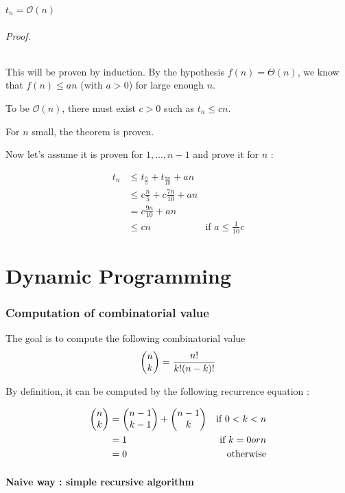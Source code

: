 \begin{theorem}
$t_n = \mathcal{O} (n)$
\end{theorem}

\paragraph*{Proof.}This will be proven by induction. By the hypothesis $f(n) = \Theta (n)$, we know that $f(n) \leq an$ (with $a>0$) for large enough $n$.

To be $\mathcal{O}(n)$, there must exist $c>0$ such as $t_n \leq cn$.

For $n$ small, the theorem is proven.

Now let's assume it is proven for $1,...,n-1$ and prove it for $n$ :

\begin{align*}
t_n &\leq t_{\frac{n}{5}} + t_{\frac{7n}{10}} + an\\
&\leq c \frac{n}{5} + c \frac{7n}{10} + an \\
&= c \frac{9n}{10} + an\\
&\leq cn &\text{if } a\leq \frac{1}{10}c
\end{align*}
\QED

\part{Dynamic Programming}

    \section{Computation of combinatorial value}



The goal is to compute the following combinatorial value  $$\left( \begin{matrix} n\\ k\end{matrix} \right) = \frac{n!}{k!(n-k)!}$$

By definition, it can be computed by the following recurrence equation :

\begin{align*}
\left( \begin{matrix} n\\ k\end{matrix} \right) &= \left( \begin{matrix} n-1\\ k-1\end{matrix} \right) + \left( \begin{matrix} n-1\\ k\end{matrix} \right) & \text{if } 0 < k<n\\
&=1 & \text{if } k=0 or n\\
&=0 & \text{otherwise}
\end{align*}

        
        
        \subsection{Naive way : simple recursive algorithm}




